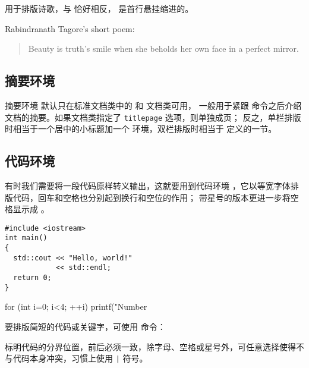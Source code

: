  用于排版诗歌，与  恰好相反， 是首行悬挂缩进的。
\begin{example}
Rabindranath Tagore's short poem:
\begin{verse}
Beauty is truth's smile
when she beholds her own face in
a perfect mirror.
\end{verse}
\end{example}

\subsection{摘要环境}\label{subsec:abstract}

摘要环境  默认只在标准文档类中的  和  文档类可用，
一般用于紧跟  命令之后介绍文档的摘要。如果文档类指定了 \texttt{titlepage} 选项，则单独成页；
反之，单栏排版时相当于一个居中的小标题加一个  环境，双栏排版时相当于  定义的一节。

\subsection{代码环境}\label{subsec:verbatim}

有时我们需要将一段代码原样转义输出，这就要用到代码环境 ，它以等宽字体排版代码，回车和空格也分别起到换行和空位的作用；
带星号的版本更进一步将空格显示成 \textvisiblespace 。
\begin{example}
\begin{verbatim}
#include <iostream>
int main()
{
  std::cout << "Hello, world!"
            << std::endl;
  return 0;
}
\end{verbatim}
\end{example}

\begin{example}
\begin{verbatim*}
for (int i=0; i<4; ++i)
  printf("Number %d\n",i);
\end{verbatim*}
\end{example}

要排版简短的代码或关键字，可使用  命令：
\begin{command}
\end{command}

 标明代码的分界位置，前后必须一致，除字母、空格或星号外，可任意选择使得不与代码本身冲突，习惯上使用 \texttt| 符号。

